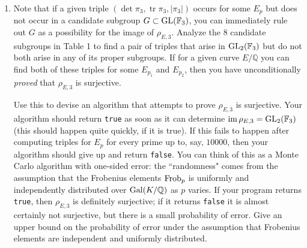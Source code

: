 \documentclass[11pt]{article}
\newcommand{\FF}{\mathbb{F}}
\newcommand{\Q}{\mathbb{Q}}
\newcommand{\Gal}{{\rm Gal}}
\newcommand{\GL}{{\rm GL}}
\newcommand{\Frob}{{\rm Frob}}
\newcommand{\im}{\operatorname{im}}
\newcommand{\tr}{\operatorname{tr}}
\theoremstyle{definition}
\begin{document}
\begin{enumerate}[{\bf(a)}]
For $\ell=3$, use your program to provisionally determine the image of $\rho_{E,3}$ for each of the ten elliptic curves below, by comparing the statistics computed by your program with the corresponding statistics for each of the 8 candidate subgroups of $\GL_2(\FF_3)$.  With $N$ around 5000 or 10000 you should be able to easily distinguish among the possibilities.
The curves below are also listed in the notebook linked to above.


\begin{center}
\begin{tabular}{ll}
$y^2=x^3+x$ & $y^2=x^3+1$\\
$y^2 = x^3+432$ & $y^2=x^3+x+1$\\
$y^2=x^3+21x+26$ & $y^2=x^3-112x+784$\\
$y^2=x^3-3915x+113670$ &$y^2=x^3+4752x+127872$\\
 $y^2=x^3+5805x-285714\qquad\qquad$&$y^2=x^3+652509x-621544482$\\
\end{tabular}
\end{center}

\item
Note that if a given triple $(\det \pi_3, \tr \pi_3, |\pi_3|)$ occurs for some $E_p$ but does not occur in a candidate subgroup $G\subset\GL(\FF_3)$,  you can immediately rule out $G$ as a possibility for the image of $\rho_{E,3}$.
Analyze the 8 candidate subgroups in Table 1 to find a pair of triples that arise in $\GL_2(\FF_3)$ but do not both arise in any of its proper subgroups.
If for a given curve $E/\Q$ you can find both of these triples for some $E_{p_1}$ and $E_{p_2}$, then you have unconditionally \emph{proved} that $\rho_{E,3}$ is surjective.

Use this to devise an algorithm that attempts to prove $\rho_{E,3}$ is surjective.
Your algorithm should return \texttt{true} as soon as it can determine $\im\rho_{E,3}=\GL_2(\FF_3)$ (this should happen quite quickly, if it is true).
If this fails to happen after computing triples for $E_p$ for every prime up to, say, $10000$, then your algorithm should give up and return \texttt{false}.
You can think of this as a Monte Carlo algorithm with one-sided error: the ``randomness" comes from the assumption that the Frobenius elements $\Frob_p$ is uniformly and independently distributed over $\Gal(K/\Q)$ as $p$ varies.
If your program returns \texttt{true}, then $\rho_{E,3}$ is definitely surjective; if it returns \texttt{false} it is almost certainly not surjective, but there is a small probability of error.
Give an upper bound on the probability of error under the assumption that Frobenius elements are independent and uniformly distributed.


\end{enumerate}
\end{document}

